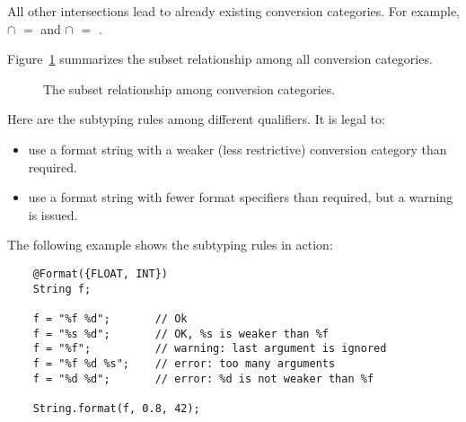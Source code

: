 \noindent All other intersections lead to already existing conversion categories.
For example,  $\cap$  $=$  and 
 $\cap$  $=$ .

Figure~\ref{fig-formatter-cat} summarizes the subset 
relationship among all conversion categories.

\begin{figure}[thbp]
    \caption{The subset relationship among conversion categories.}
    \label{fig-formatter-cat}
\end{figure}



% 

\label{formatter-format-subtyping}
Here are the subtyping rules among different  qualifiers.
It is legal to:

\begin{itemize}
\item use a format string with a weaker (less restrictive) conversion category than required.
\item use a format string with fewer format specifiers than required, but a warning is issued. 
\end{itemize}

The following example shows the subtyping rules in action:

\begin{Verbatim}
    @Format({FLOAT, INT}) 
    String f;

    f = "%f %d";       // Ok
    f = "%s %d";       // OK, %s is weaker than %f
    f = "%f";          // warning: last argument is ignored
    f = "%f %d %s";    // error: too many arguments
    f = "%d %d";       // error: %d is not weaker than %f

    String.format(f, 0.8, 42);
\end{Verbatim}

